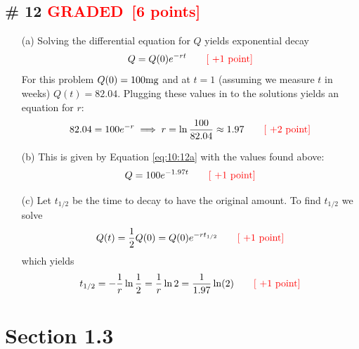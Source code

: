\documentclass[12pt,letterpaper]{exam}
\newcommand{\grade}{\textcolor{red}{GRADED}}
\newcommand{\pts}[1]{\textcolor{red}{[#1]}}
\begin{document}
\subsection*{\# 12 \grade \, \pts{6 points}}
\begin{enumerate}
\item[(a)] Solving the differential equation for $Q$ yields exponential decay
\begin{equation}\label{eq:10:12a}
Q = Q(0)e^{-rt} \quad \quad \text{\pts{ +1 point}}
\end{equation}
For this problem $Q(0) = 100{\rm mg}$ and at $t=1$ (assuming we measure $t$ in weeks) $Q(t) = 82.04$. Plugging these values in to the solutions yields an equation for $r$: 
\begin{equation}
82.04 = 100 e^{-r} \implies r =  \ln \frac{100}{82.04} \approx 1.97 \quad  \quad \text{\pts{ +2 point}}
\end{equation}
\item[(b)] This is given by Equation \eqref{eq:10:12a} with the values found above:  
\begin{equation}
Q = 100e^{-1.97 t}\quad \quad \text{\pts{ +1 point}}
\end{equation}
\item[(c)] Let $t_{1/2}$ be the time to decay to have the original amount. To find $t_{1/2}$ we solve 
\begin{equation}
Q(t) = \frac{1}{2}Q(0) =Q(0)e^{-rt_{1/2}}   \quad \quad  \text{\pts{ +1 point}}
\end{equation}
which yields 
\begin{equation}
t_{1/2} = - \frac{1}{r} \ln \frac{1}{2} = \frac{1}{r} \ln 2 = \frac{1}{1.97}\ln (2) \quad\quad \text{\pts{ +1 point}}
\end{equation}
\end{enumerate}




\section*{Section 1.3}

\end{document}
